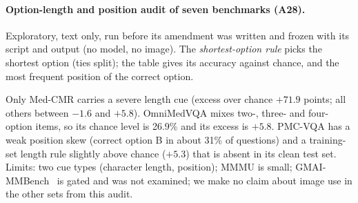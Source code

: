 \paragraph{Option-length and position audit of seven benchmarks (A28).}
\label{sec:supp-audit}
Exploratory, text only, run before its amendment was written and frozen with its script and output (no model, no image).
The \emph{shortest-option rule} picks the shortest option (ties split); the table gives its accuracy against chance, and the most frequent position of the correct option.
\begin{center}
\footnotesize
\setlength{\tabcolsep}{4pt}
\end{center}
Only Med-CMR carries a severe length cue (excess over chance $+71.9$ points; all others between $-1.6$ and $+5.8$).
OmniMedVQA mixes two-, three- and four-option items, so its chance level is 26.9\% and its excess is $+5.8$.
PMC-VQA has a weak position skew (correct option B in about 31\% of questions) and a training-set length rule slightly above chance ($+5.3$) that is absent in its clean test set.
Limits: two cue types (character length, position); MMMU is small; GMAI-MMBench~\cite{chen2024gmai} is gated and was not examined; we make no claim about image use in the other sets from this audit.

